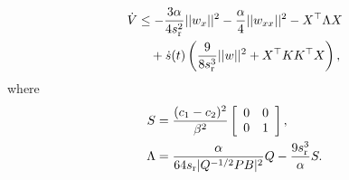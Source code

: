 \documentclass[letterpaper, 10 pt, conference]{cls/ieeeconf}
\DeclareMathOperator*{\diag}{diag}
\theoremstyle{definition}
\newcommand{\bbR}{\mathbb{R}}
\begin{document}
\begin{align}
 \dot V  &   \leq - \frac{3 \alpha}{4 s_{\rm r}^2} || w_{x}||^2
    - \frac{ \alpha}{4}  || w_{xx}||^2 - X^\top \Lambda X 
    \notag\\ & \quad + \dot s(t) \left( \frac{9 }{8 s_{\rm r}^3}||w ||^2 + X^\top K K^\top X \right) , \label{eq:Vdot-1}
\end{align}
where 
\begin{align}
    S & = \frac{(c_1 - c_2)^2}{ \beta^2  }
     \left [
    \begin{array}{cc}
       0  & 0 \\
       0  & 1
    \end{array}
    \right] ,  \label{eq:S-def} \\
    \Lambda & = \frac{ \alpha}{64 s_{\rm r} | Q^{-1/2} PB |^2} Q - \frac{9 s_{\rm r}^3}{\alpha}S . \label{eq:Lambda-def}
\end{align}
\end{document}
